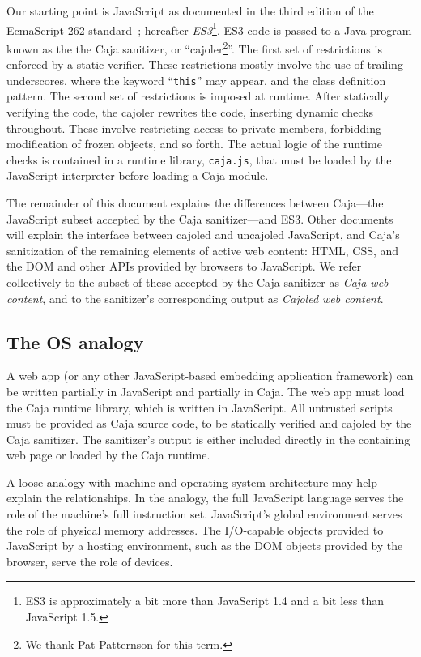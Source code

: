 \documentclass[letterpaper,twocolumn,10pt]{article}
\newcommand{\code}[1]{{\tt {#1}}}              %
\begin{document}
Our starting point is JavaScript as documented in the third edition of the 
EcmaScript 262 standard~\cite{ECMA-262}; hereafter \emph{ES3}\footnote{
%
ES3 is approximately a bit more than JavaScript 1.4 and a bit less than 
JavaScript 1.5.
%
}.  ES3 code is passed to a Java program known as the the Caja sanitizer, 
or ``cajoler\footnote{
%
We thank Pat Patternson for this term.
%
}''.  The first set of restrictions is enforced by a static verifier. 
These restrictions mostly involve the use of trailing underscores, 
where the keyword ``\code{this}'' may appear, and the class definition pattern.
The second set of restrictions is imposed at runtime.  After statically 
verifying the code, the cajoler rewrites the code, inserting dynamic 
checks throughout. These involve restricting access to private members, 
forbidding modification of frozen objects, and so forth.  The actual 
logic of the runtime checks is contained in a runtime library, 
\code{caja.js}, that must be loaded by the JavaScript interpreter before 
loading a Caja module.

The remainder of this document explains the differences between Caja---the 
JavaScript subset accepted by the Caja sanitizer---and ES3. Other documents 
will explain the interface between cajoled and uncajoled JavaScript, and 
Caja's sanitization of the remaining elements of active web content: HTML, 
CSS, and the DOM and other APIs provided by browsers to JavaScript. We refer 
collectively to the subset of these accepted by the Caja sanitizer as 
\emph{Caja web content}, and to the sanitizer's corresponding output as 
\emph{Cajoled web content}.

\subsection{The OS analogy}
\label{subsec:os-analog}

A web app (or any other JavaScript-based embedding application framework) can 
be written partially in JavaScript and partially in Caja. The web app must load 
the Caja runtime library, which is written in JavaScript. All 
untrusted scripts must be provided as Caja source code, to be statically 
verified and cajoled by the Caja sanitizer. The sanitizer's output is 
either included directly in the containing web page or loaded by the Caja 
runtime.

A loose analogy with machine and operating system architecture may help 
explain the relationships. In the analogy, the full JavaScript language 
serves the role of the machine's full instruction set. JavaScript's global 
environment serves the role of physical memory addresses. The I/O-capable 
objects provided to JavaScript by a hosting environment, such as the DOM 
objects provided by the browser, serve the role of devices.
\end{document}
